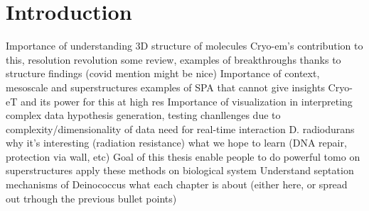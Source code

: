 \chapter{Introduction}\label{introduction}

\begin{outline}
\1 Importance of understanding 3D structure of molecules
    \2 Cryo-em's contribution to this, resolution revolution
    \2 some review, examples of breakthroughs thanks to structure findings (covid mention might be nice)
\1 Importance of context, mesoscale and superstructures
    \2 examples of SPA that cannot give insights
    \2 Cryo-eT and its power for this at high res
\1 Importance of visualization in interpreting complex data
    \2 hypothesis generation, testing
    \2 chanllenges due to complexity/dimensionality of data
    \2 need for real-time interaction
\1 D. radiodurans
    \2 why it's interesting (radiation resistance)
    \2 what we hope to learn (DNA repair, protection via wall, etc)
\1 Goal of this thesis
    \2 enable people to do powerful tomo on superstructures
    \2 apply these methods on biological system
    \2 Understand septation mechanisms of Deinococcus
\1 what each chapter is about (either here, or spread out trhough the previous bullet points)
\end{outline}

